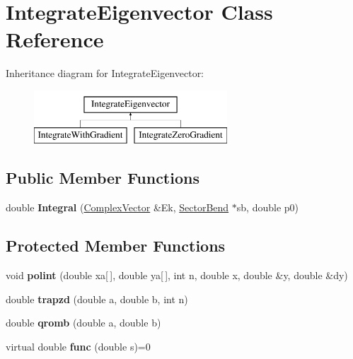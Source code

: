 \hypertarget{classIntegrateEigenvector}{}\section{Integrate\+Eigenvector Class Reference}
\label{classIntegrateEigenvector}
Inheritance diagram for Integrate\+Eigenvector\+:\begin{figure}[H]
\begin{center}
\leavevmode
\includegraphics[height=2.000000cm]{classIntegrateEigenvector}
\end{center}
\end{figure}
\subsection*{Public Member Functions}
\begin{DoxyCompactItemize}
\item 
\mbox{\label{classIntegrateEigenvector_a9e545ef8092a0b042184ca76632d421a}} 
double {\bfseries Integral} (\hyperlink{classTLAS_1_1Vector}{Complex\+Vector} \&Ek, \hyperlink{classSectorBend}{Sector\+Bend} $\ast$sb, double p0)
\end{DoxyCompactItemize}
\subsection*{Protected Member Functions}
\begin{DoxyCompactItemize}
\item 
\mbox{\label{classIntegrateEigenvector_a7fe101905db849cd2aefed777e5feee7}} 
void {\bfseries polint} (double xa\mbox{[}$\,$\mbox{]}, double ya\mbox{[}$\,$\mbox{]}, int n, double x, double \&y, double \&dy)
\item 
\mbox{\label{classIntegrateEigenvector_ae9fea1ffbe9b85b00fe2835385af93eb}} 
double {\bfseries trapzd} (double a, double b, int n)
\item 
\mbox{\label{classIntegrateEigenvector_ae3fb01a52a3539c391b68c0ebf1a125d}} 
double {\bfseries qromb} (double a, double b)
\item 
\mbox{\label{classIntegrateEigenvector_ac119f9ee70abc5f5ba083a0ba5785be1}} 
virtual double {\bfseries func} (double s)=0
\end{DoxyCompactItemize}
